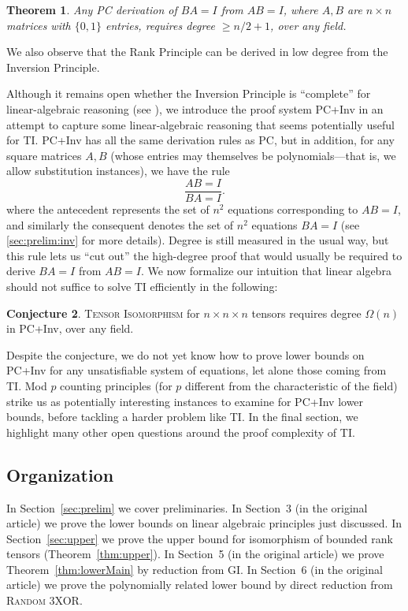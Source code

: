 \documentclass[10pt,a4paper]{article}
\newtheorem{theorem}{Theorem}[section]
\theoremstyle{definition}
\newtheorem{conjecture}[theorem]{Conjecture}
\begin{document}
\begin{theorem}
Any PC derivation of $BA = I$ from $AB=I$, where $A,B$ are $n \times n$ matrices with $\{0,1\}$ entries, requires degree $\geq n/2+1$, over any field.
\end{theorem}

We also observe that the Rank Principle can be derived in low degree from the Inversion Principle. 

Although it remains open whether the Inversion Principle is ``complete'' for linear-algebraic reasoning (see \cite{soltys, SC}), we introduce the proof system PC+Inv in an attempt to capture some linear-algebraic reasoning that seems potentially useful for \textsc{TI}. PC+Inv has all the same derivation rules as PC, but in addition, for any square matrices $A,B$ (whose entries may themselves be polynomials---that is, we allow substitution instances), we have the rule
\[
\frac{AB=I}{BA=I}.
\]
where the antecedent represents the set of $n^2$ equations corresponding to $AB=I$, and similarly the consequent denotes the set of $n^2$ equations $BA=I$ (see \ref{sec:prelim:inv} for more details). Degree is still measured in the usual way, but this rule lets us ``cut out'' the high-degree proof that would usually be required to derive $BA=I$ from $AB=I$. We now formalize our intuition that linear algebra should not suffice to solve \textsc{TI} efficiently in the following:

\begin{conjecture} \label{conj:inv}
\textsc{Tensor Isomorphism} for $n \times n \times n$ tensors requires degree $\Omega(n)$ in PC+Inv, over any field.
\end{conjecture}

Despite the conjecture, we do not yet know how to prove lower bounds on PC+Inv for any unsatisfiable system of equations, let alone those coming from \textsc{TI}. Mod $p$ counting principles (for $p$ different from the characteristic of the field) strike us as potentially interesting instances to examine for PC+Inv lower bounds, before tackling a harder problem like \textsc{TI}. In the final section, we highlight many other open questions around the proof complexity of \textsc{TI}.

\subsection{Organization}
In Section~\ref{sec:prelim} we cover preliminaries. In Section~3 (in the original article) we prove the lower bounds on linear algebraic principles just discussed. In Section~\ref{sec:upper} we prove the upper bound for isomorphism of bounded rank tensors (Theorem~\ref{thm:upper}). In Section~5 (in the original article) we prove Theorem~\ref{thm:lowerMain} by reduction from \textsc{GI}. In Section~6 (in the original article) we prove the polynomially related lower bound by direct reduction from \textsc{Random 3XOR}.
\end{document}
